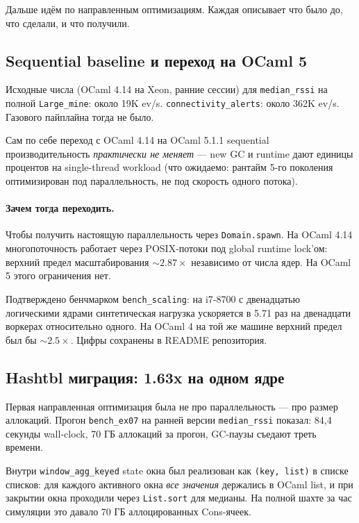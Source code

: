Дальше идём по направленным оптимизациям. Каждая описывает что
было до, что сделали, и что получили.

\subsection{Sequential baseline и переход на OCaml 5}

Исходные числа (OCaml 4.14 на Xeon, ранние сессии) для
\texttt{median\_rssi} на полной \texttt{Large\_mine}: около 19K
ev/s. \texttt{connectivity\_alerts}: около 362K ev/s. Газового
пайплайна тогда не было.

Сам по себе переход с OCaml 4.14 на OCaml 5.1.1 sequential
производительность \emph{практически не меняет} --- new GC и
runtime дают единицы процентов на single-thread workload (что
ожидаемо: рантайм 5-го поколения оптимизирован под параллельность,
не под скорость одного потока).

\paragraph{Зачем тогда переходить.} Чтобы получить настоящую
параллельность через \texttt{Domain.spawn}. На OCaml 4.14
многопоточность работает через POSIX-потоки под global runtime
lock'ом: верхний предел масштабирования $\sim 2.87 \times$
независимо от числа ядер. На OCaml 5 этого ограничения нет.

Подтверждено бенчмарком \texttt{bench\_scaling}: на i7-8700 с
двенадцатью логическими ядрами синтетическая нагрузка ускоряется в
5.71 раз на двенадцати воркерах относительно одного. На OCaml 4 на
той же машине верхний предел был бы $\sim 2.5 \times$. Цифры
сохранены в README репозитория.

\subsection{Hashtbl миграция: 1.63x на одном ядре}

Первая направленная оптимизация была не про параллельность ---
про размер аллокаций. Прогон \texttt{bench\_ex07} на ранней версии
\texttt{median\_rssi} показал: 84{,}4 секунды wall-clock, 70 ГБ
аллокаций за прогон, GC-паузы съедают треть времени.

Внутри \texttt{window\_agg\_keyed} state окна был реализован как
\texttt{(key, list)} в списке списков: для каждого активного окна
\emph{все значения} держались в OCaml list, и при закрытии окна
проходили через \texttt{List.sort} для медианы. На полной шахте за
час симуляции это давало 70 ГБ аллоцированных Cons-ячеек.

